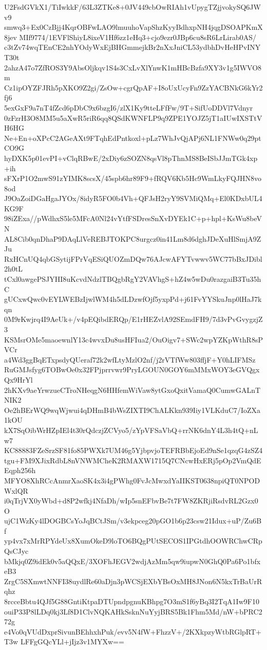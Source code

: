 U2FsdGVkX1/TiIwkkF/63L3ZTKe8+0JV449cbOwRIAh1vUpygTZjjvokySQ6JWv9
smwq3+Ex0CzBjj4KqrOBFwLAO9lmuuhoVapShzKyyBdhxpNH4jqgDSOAPKmX8jev
MIf9774/1EVFlShiyL8ixeV1Hf6zz1eHq3+cjo9ezr0JBp6cu8sR6LrLirab0AS/
c3tZv74wqTEnCE2nhYOdyWxEjBHGmmejkBr2nXxJniCL53ydbhDvHeHPvINYT30t
2ahzA47o7ZfROS3Y9AbsOljkqv1S4s3CxLvXlYnwK1mHBcBzfa9XY3v1g5IWVO8m
Cz1ipOYZFJRh5pXKO9Z2gi/ZsOw+cgrQpAF+I8oUxUcyFn9ZzYACBNkG6kYr2fj6
5exGxF9a7nT4fZcd6pDbC9x6bzgI6/zlX1Ky9tteLFfFw/9T+SifUoDDVl7Vdnyr
0zFzrH3O8MM5u5aXwR5riR6qq8QSdKWNFLP9q9ZPE1YOJZ5jT1aIUwIXSTtVH6HG
Ne+En+oXPcC2AGeAXt9FTqhEdPntkoxl+pLz7WhJvQjAPj6NL1FNWw0q29ptCO9G
hyDXK5p01evPI+vClqRBwE/2xDiy6zSOZN8qsVl8pThnMS8BeISbJJmTGk4xp+ih
sFXrP1O2mwS91zYIMK8scsX/45spb6hr89F9+fRQV6Kb5Hc9WmLkyFQJHN8vo8od
J9OaZoiDGaHgaJYOx/8idyR5FO0b4Vh+QFJsH2ryY9SVMiQMq+El0KDxbUL4KG9F
98iZExa//pWdhxS5le5MFcA0Nl24vYtfFSDresSnXvDYEk1C+p+hpl+KsWu8beVN
AL8Cib0qnDhaP9DAqLlVeREBJTOKPC8urgcz0in41Lm8d6dghJDeXuHlSmjA9ZJu
RxHCnUQ4qbGSytijFPrVqESiQUOZmDQw76AJcwAFYTvwwv5WC77bBxJDibl2h0tL
tCxl0awgePSJYHI8uKcvdNdzlTBQgbRgY2VAVhgS+hZ4w5wDu0razgaiB3Tu35hC
gUCxwQwc0vEYLWEBzIjwlWM4h5dLDzwfOjf5yxpPd+j61FvYYSkuJnp0lHaJ7kqn
0M9rKwjrq4I9AeUk+/v4pEQibdERQp/E1rHEZvlA92SEmdFH9/7d3vPvGvygzjZ3
KSMsrOMe5maoewnlY13c4wvxDu8usHFIua2/OuOigv7+SWc2wpYZKpWthR8sPVCr
a4Wd3ggBqETxpsdyQUeraf72k2wfLtyMzlO2nf/j2rVTfWw803ffjF+Y0hLIFMSz
RuGMJsfyg6TOBwOe0x32FPjprrvwr9PryLGOUN0GOY6mMMxWOY3eGVQgxQx9HrYl
2hKXv9aeYrwzueCTroNHeqgN6HHfemWiVaw8ytGxoQxitVamaQ0CumwGALnTNIK2
Oe2hBErWQ9wqWjwui4qDHmB4bWsZIXTI9ChALKkn939Iiy1VLKduC7/IoZXa1kOU
kX7SqOibWrHZpIEl4t30rQdczjZCVyo5/zYpVFSaVbQ+rrNK6dnY4L3h4tQ+nLw7
KC88883FZeSrzSF81fo85PWXk7UM46g5YjbpvjoTEFRBbEjoEd9nSe1qzqG4zSZ4
tgu+FM9XJixRdbL8nVNWMCheK2RMAXW1715Q7CNcwHxERj5pOp2VmQdEEqph256h
MFYO8XhRCcAnmrXaoSK4x3i4gPWhg0FvJcMwxdYaIIKST0638npiQT0NPODWxlQR
i0qTrjVX0yWbd+d8P2wfkj4NfaDh/wIp5snEFbvBe7t7FW8ZKRjiRsdvRL2Gzx0O
ujC1WzKy4lDOGBCsYoJqBCtJSm/v3ekpceg20pGO1b6p23csw21Idux+uP/Zu6Bf
yp4vx7xMrRPYdeUx8XumOkeD9loTO6BQgPUtSECOS1IPGtdhOOWRChwCRpQsCJyc
bMkjq0Z9idEk0v5aQQxE/3XOFhJEGV2wdjAzMm5qw9iupwN0GhQ0Pa6Po1bfxeB3
ZrgC5SXmwtNNFI38uydlRe60aDjn3pWCSjEXbYBsOxMH8JNon6N5kxTrBaUrRqhz
8rcceBbtu4QJf5G88GntiKtpaDTUpndpgnuKBhpg7O3mS1f6yBq3I2TqA1Iw9F10
ouiP33P8lLDq0kj3Lf8D1ClvNQKAHkSsknNuYyjBRS5Bk1Fhm5Md/nW+bPRC272g
e4Vo0qVUdDxprSivunBEhhxhPuk/evv5N4fW+FhzzV+/2KXkpzyWtbRGlpRT+T3w
LFFgGQcYLl+jIjz3v1MYXw==
